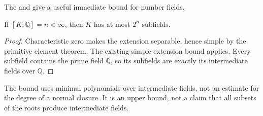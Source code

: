 The  and
 give a useful immediate
bound for number fields.

\begin{corollary}\label{number-field-bound}
If $[K:\mathbb Q]=n<\infty$, then $K$ has at most $2^n$ subfields.
\end{corollary}
\begin{proof}\label{number-field-bound-proof}
Characteristic zero makes the extension separable, hence simple by
the primitive element theorem. The existing simple-extension bound
applies. Every subfield contains the prime field $\mathbb Q$, so its
subfields are exactly its intermediate fields over $\mathbb Q$.
\end{proof}
\begin{remark}\label{number-field-bound-method}
The bound uses minimal polynomials over intermediate fields, not an
estimate for the degree of a normal closure. It is an upper bound,
not a claim that all subsets of the roots produce intermediate fields.
\end{remark}
